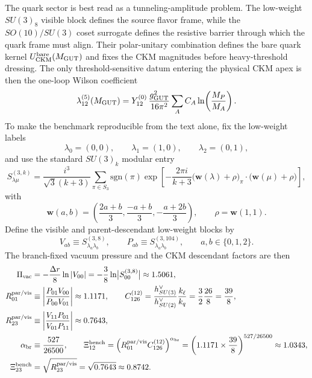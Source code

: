 \documentclass[11pt]{article}
\begin{document}
The quark sector is best read as a tunneling-amplitude problem. The low-weight
$SU(3)_8$ visible block defines the source flavor frame, while the
$SO(10)/SU(3)$ coset surrogate defines the resistive barrier through which the
quark frame must align. Their polar-unitary combination defines the bare quark
kernel $U_{\rm CKM}^{\rm bare}(M_{\rm GUT})$ and fixes the CKM magnitudes before
heavy-threshold dressing. The only threshold-sensitive datum entering the
physical CKM apex is then the one-loop Wilson coefficient
\begin{equation}
 \lambda_{12}^{(5)}(M_{\rm GUT})
 =
 Y_{12}^{(0)}\,\frac{g_{\rm GUT}^2}{16\pi^2}
 \sum_A C_A\ln\!\left(\frac{M_P}{M_A}\right).
\end{equation}
To make the benchmark reproducible from the text alone, fix the low-weight
labels
\begin{equation}
 \lambda_0=(0,0),
 \qquad
 \lambda_1=(1,0),
 \qquad
 \lambda_2=(0,1),
\end{equation}
and use the standard $SU(3)_k$ modular entry
\begin{equation}
 S^{(3,k)}_{\lambda\mu}
 =
 \frac{i^3}{\sqrt{3}(k+3)}
 \sum_{\pi\in S_3}
 \mathrm{sgn}(\pi)
 \exp\!\left[-\frac{2\pi i}{k+3}\bigl(\mathbf w(\lambda)+\rho\bigr)_{\pi}\cdot\bigl(\mathbf w(\mu)+\rho\bigr)\right],
\end{equation}
with
\begin{equation}
 \mathbf w(a,b)
 =
 \left(
  \frac{2a+b}{3},
  \frac{-a+b}{3},
  -\frac{a+2b}{3}
 \right),
 \qquad
 \rho=\mathbf w(1,1).
\end{equation}
Define the visible and parent-descendant low-weight blocks by
\begin{equation}
 V_{ab}\equiv S^{(3,8)}_{\lambda_a\lambda_b},
 \qquad
 P_{ab}\equiv S^{(3,104)}_{\lambda_a\lambda_b},
 \qquad a,b\in\{0,1,2\}.
\end{equation}
The branch-fixed vacuum pressure and the CKM descendant factors are then
\begin{align}
 \Pi_{\rm vac}
 &=
 -\frac{\Delta r}{8}\ln|V_{00}|
 =
 -\frac{3}{8}\ln\bigl|S_{00}^{(3,8)}\bigr|
 \approx 1.5061,
 \notag\\
 R_{01}^{\rm par/vis}
 &\equiv
 \left|\frac{P_{01}V_{00}}{P_{00}V_{01}}\right|
 \approx 1.1171,
 \qquad
 C_{126}^{(12)}
 =
 \frac{h^{\vee}_{SU(3)}}{h^{\vee}_{SU(2)}}\frac{k_{\ell}}{k_q}
 =
 \frac{3}{2}\frac{26}{8}
 =
 \frac{39}{8},
 \notag\\
 R_{23}^{\rm par/vis}
 &\equiv
 \left|\frac{V_{11}P_{01}}{V_{01}P_{11}}\right|
 \approx 0.7643,
 \notag\\
 \alpha_{\rm br}
 &\equiv
 \frac{527}{26500},
 \qquad
 \Xi_{12}^{\rm bench}
 =
 \left(R_{01}^{\rm par/vis}C_{126}^{(12)}\right)^{\alpha_{\rm br}}
 =
 \left(1.1171\times\frac{39}{8}\right)^{527/26500}
 \approx 1.0343,
 \notag\\
 \Xi_{23}^{\rm bench}
 &=
 \sqrt{R_{23}^{\rm par/vis}}
 =
 \sqrt{0.7643}
 \approx 0.8742.
\end{align}
\end{document}
